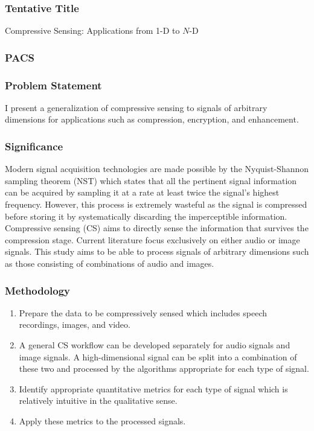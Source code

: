 \documentclass[10pt,oneside]{article}
\begin{document}
\subsubsection*{Tentative Title} Compressive Sensing: Applications from 1-D to $N$-D

\subsubsection*{PACS}

\subsubsection*{Problem Statement}
I present a generalization of compressive sensing to signals of arbitrary dimensions for applications such as compression, encryption, and enhancement.

\subsubsection*{Significance}
Modern signal acquisition technologies are made possible by the Nyquist-Shannon sampling theorem (NST) which states that all the pertinent signal information can be acquired by sampling it at a rate at least twice the signal's highest frequency. However, this process is extremely wasteful as the signal is compressed before storing it by systematically discarding the imperceptible information. Compressive sensing (CS) aims to directly sense the information that survives the compression stage. Current literature focus exclusively on either audio or image signals. This study aims to be able to process signals of arbitrary dimensions such as those consisting of combinations of audio and images.

\subsubsection*{Methodology}
\begin{enumerate}
	\item Prepare the data to be compressively sensed which includes speech recordings, images, and video.
	\item A general CS workflow can be developed separately for audio signals and image signals. A high-dimensional signal can be split into a combination of these two and processed by the algorithms appropriate for each type of signal.
	\item Identify appropriate quantitative metrics for each type of signal which is relatively intuitive in the qualitative sense.
	\item Apply these metrics to the processed signals.
\end{enumerate}
\end{document}
